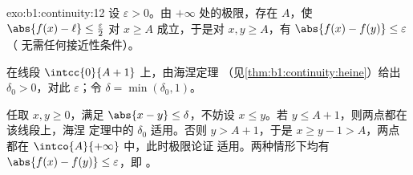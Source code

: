 \begin{solution}{exo:b1:continuity:12}
设 $\varepsilon > 0$。由 $+\infty$ 处的极限，存在 $A$，使
$\abs{f(x) - \ell} \leq \frac\varepsilon2$ 对 $x \geq A$ 成立，于是对
$x, y \geq A$，有 $\abs{f(x) - f(y)} \leq \varepsilon$（
无需任何接近性条件）。

在线段 $\intcc{0}{A + 1}$ 上，由海涅定理
（见\cref{thm:b1:continuity:heine}）给出 $\delta_0 > 0$，对此
$\varepsilon$；令 $\delta = \min(\delta_0, 1)$。

任取 $x, y \geq 0$，满足 $\abs{x - y} \leq \delta$，不妨设 $x
\leq y$。若 $y \leq A + 1$，则两点都在该线段上，海涅
定理中的 $\delta_0$ 适用。否则 $y > A + 1$，于是 $x \geq y - 1 >
A$，两点都在 $\intco{A}{+\infty}$ 中，此时极限论证
适用。两种情形下均有 $\abs{f(x) - f(y)} \leq \varepsilon$，即
。
\end{solution}

